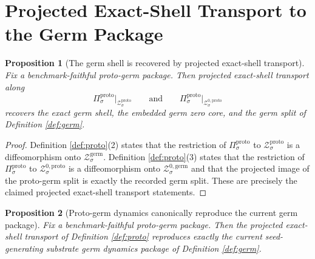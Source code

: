 \documentclass[11pt]{article}
\newcommand{\GermShellSet}[1]{\mathcal Z_{#1}^{\mathrm{germ}}}
\newcommand{\GermZeroCore}[1]{\mathcal Z_{#1}^{0,\mathrm{germ}}}
\newcommand{\ProtoProj}[1]{\Pi_{#1}^{\mathrm{proto}}}
\newcommand{\ProtoShellSet}[1]{\mathcal Z_{#1}^{\mathrm{proto}}}
\newcommand{\ProtoZeroCore}[1]{\mathcal Z_{#1}^{0,\mathrm{proto}}}
\newtheorem{proposition}{Proposition}
\begin{document}
\section{Projected Exact-Shell Transport to the Germ Package}

\begin{proposition}[The germ shell is recovered by projected exact-shell transport]
\label{prop:shell}
Fix a benchmark-faithful proto-germ package. Then projected exact-shell transport along
\[
\ProtoProj{\sigma}\big|_{\ProtoShellSet{\sigma}}
\qquad\text{and}\qquad
\ProtoProj{\sigma}\big|_{\ProtoZeroCore{\sigma}}
\]
recovers the exact germ shell, the embedded germ zero core, and the germ split of Definition \ref{def:germ}.
\end{proposition}

\begin{proof}
Definition \ref{def:proto}(2) states that the restriction of \(\ProtoProj{\sigma}\) to \(\ProtoShellSet{\sigma}\) is a diffeomorphism onto \(\GermShellSet{\sigma}\). Definition \ref{def:proto}(3) states that the restriction of \(\ProtoProj{\sigma}\) to \(\ProtoZeroCore{\sigma}\) is a diffeomorphism onto \(\GermZeroCore{\sigma}\) and that the projected image of the proto-germ split is exactly the recorded germ split. These are precisely the claimed projected exact-shell transport statements.
\end{proof}

\begin{proposition}[Proto-germ dynamics canonically reproduce the current germ package]
\label{prop:germ}
Fix a benchmark-faithful proto-germ package. Then the projected exact-shell transport of Definition \ref{def:proto} reproduces exactly the current seed-generating substrate germ dynamics package of Definition \ref{def:germ}.
\end{proposition}
\end{document}
